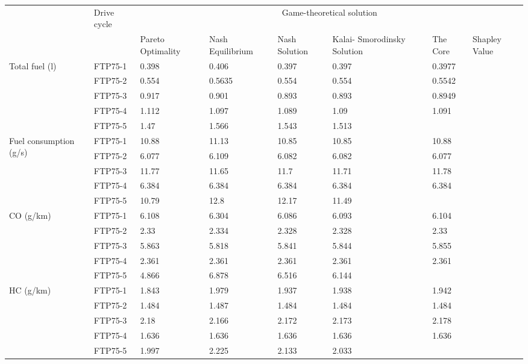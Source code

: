 \begin{table}[h]
\centering
\begin{tabular}{ |p{1.5cm}|p{1.5cm}|p{1.3cm}|p{1.3cm}|p{1.3cm}|p{1.3cm}|p{1.3cm}|p{1.3cm}|} 
 \hline
  \cline{3-8}
   & Drive cycle & \multicolumn{6}{|c|}{Game-theoretical solution} \\
   \cline{3-8}
   & & Pareto Optimality & Nash Equilibrium & Nash Solution & Kalai- Smorodinsky Solution & The Core & Shapley Value\\
 \hline\hline
 \multirow{5}{*}{\parbox{1.5cm}{Total fuel (l)}} 
 & FTP75-1 & 0.398 & 0.406 & 0.397 & 0.397 & 0.3977 & \\ 
 & FTP75-2 & 0.554 & 0.5635 & 0.554 & 0.554 & 0.5542 & \\  
 & FTP75-3 & 0.917 & 0.901 & 0.893 & 0.893 & 0.8949 & \\ 
 & FTP75-4 & 1.112 & 1.097 & 1.089 & 1.09 & 1.091 & \\ 
 & FTP75-5 & 1.47 & 1.566 & 1.543 & 1.513 & &\\ 
 \hline 
 \multirow{5}{*}{\parbox{1.5cm}{Fuel consumption (g/s)}} 
 & FTP75-1 & 10.88 & 11.13 & 10.85 & 10.85 & 10.88 &\\ 
 & FTP75-2 & 6.077 & 6.109 & 6.082 & 6.082 & 6.077 &\\ 
 & FTP75-3 & 11.77 & 11.65 & 11.7 & 11.71 & 11.78 & \\ 
 & FTP75-4 & 6.384 & 6.384 & 6.384 & 6.384 & 6.384 &\\ 
 & FTP75-5 & 10.79 & 12.8 & 12.17 & 11.49 & & \\ 
 \hline
 \multirow{5}{*}{\parbox{1.5cm}{CO (g/km)}} 
 & FTP75-1 & 6.108 & 6.304 & 6.086 & 6.093 & 6.104 & \\ 
 & FTP75-2 & 2.33 & 2.334 & 2.328 & 2.328 & 2.33 & \\ 
 & FTP75-3 & 5.863 & 5.818 & 5.841 & 5.844 & 5.855 & \\ 
 & FTP75-4 & 2.361 & 2.361 & 2.361 & 2.361 & 2.361 & \\ 
 & FTP75-5 & 4.866 & 6.878 & 6.516 & 6.144 & & \\  
 \hline 
 \multirow{5}{*}{\parbox{1.5cm}{HC (g/km)}} 
 & FTP75-1 & 1.843 & 1.979 & 1.937 & 1.938 & 1.942 & \\ 
 & FTP75-2 & 1.484 & 1.487 & 1.484 & 1.484 & 1.484 & \\  
 & FTP75-3 & 2.18 & 2.166 & 2.172 & 2.173 & 2.178 & \\ 
 & FTP75-4 & 1.636 & 1.636 & 1.636 & 1.636 & 1.636 & \\ 
 & FTP75-5 & 1.997 & 2.225 & 2.133 & 2.033 & & \\  

\end{tabular}
\end{table}
